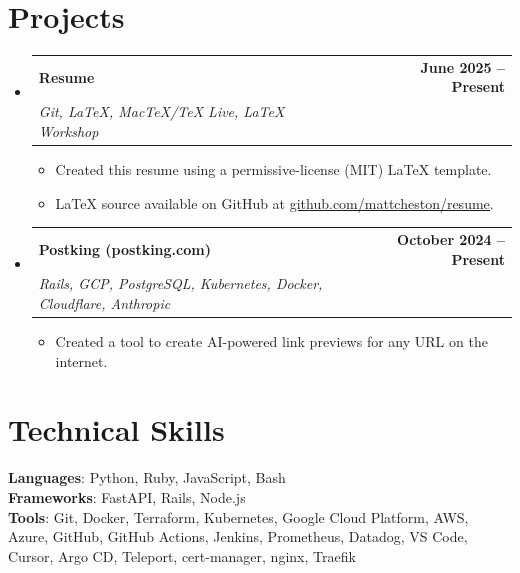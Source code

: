 \documentclass[letterpaper,11pt]{article}
\makeatletter
\newcommand{\resumeItem}[1]{
  \item\footnotesize{
    {#1 \vspace{-2pt}}
  }
}
\newcommand{\resumeProjectHeading}[3]{
    \item
    \begin{tabular*}{0.97\textwidth}{l@{\extracolsep{\fill}}r}
      \small#1 & \textbf{#3} \\
      \small#2 & \\
    \end{tabular*}\vspace{-7pt}
}
\newcommand{\resumeSubHeadingListStart}{\begin{itemize}[leftmargin=0.15in, label={}]}
\newcommand{\resumeSubHeadingListEnd}{\end{itemize}}
\newcommand{\resumeItemListStart}{\begin{itemize}}
\newcommand{\resumeItemListEnd}{\end{itemize}\vspace{-5pt}}
\makeatother
\begin{document}
\section{Projects}
    \resumeSubHeadingListStart
      \resumeProjectHeading
          {\textbf{Resume}}{\emph{Git, LaTeX, MacTeX/TeX Live, LaTeX Workshop}}{June 2025 -- Present}
          \resumeItemListStart
            \resumeItem{Created this resume using a permissive-license (MIT) LaTeX template.}
            \resumeItem{LaTeX source available on GitHub at \href{https://github.com/mattcheston/resume}{\underline{github.com/mattcheston/resume}}.}
          \resumeItemListEnd
      \resumeProjectHeading
          {\textbf{Postking (postking.com)}}{\emph{Rails, GCP, PostgreSQL, Kubernetes, Docker, Cloudflare, Anthropic}}{October 2024 -- Present}
          \resumeItemListStart
            \resumeItem{Created a tool to create AI-powered link previews for any URL on the internet.}
          \resumeItemListEnd
    \resumeSubHeadingListEnd



%
\section{Technical Skills}
 \begin{itemize}[leftmargin=0.15in, label={}]
    \small{\item{
     \textbf{Languages}{: Python, Ruby, JavaScript, Bash} \\
     \textbf{Frameworks}{: FastAPI, Rails, Node.js} \\
     \textbf{Tools}{: Git, Docker, Terraform, Kubernetes, Google Cloud Platform, AWS, Azure, GitHub, GitHub Actions, Jenkins, Prometheus, Datadog, VS Code, Cursor, Argo CD, Teleport, cert-manager, nginx, Traefik} \\
    }}
 \end{itemize}


\end{document}
